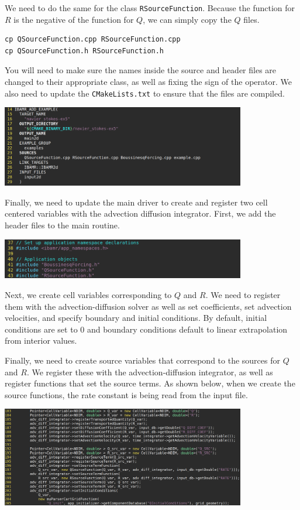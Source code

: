 \documentclass{article}
\begin{document}
We need to do the same for the class \verb|RSourceFunction|. Because the function for $R$ is the negative of the function for $Q$, we can simply copy the $Q$ files.
\begin{verbatim}
cp QSourceFunction.cpp RSourceFunction.cpp
cp QSourceFunction.h RSourceFunction.h
\end{verbatim}
You will need to make sure the names inside the source and header files are changed to their appropriate class, as well as fixing the sign of the operator. We also need to update the \verb|CMakeLists.txt| to ensure that the files are compiled.
\begin{center}
\includegraphics[width=0.8\textwidth]{Graphs/NS-ex5/add_src/cmake_lists.png}
\end{center}

Finally, we need to update the main driver to create and register two cell centered variables with the advection diffusion integrator. First, we add the header files to the main routine.
\begin{center}
\includegraphics[width=0.8\textwidth]{Graphs/NS-ex5/add_src/main_add_headers.png}
\end{center}

Next, we create cell variables corresponding to $Q$ and $R$. We need to register them with the advection-diffusion solver as well as set coefficients, set advection velocities, and specify boundary and initial conditions. By default, initial conditions are set to 0 and boundary conditions default to linear extrapolation from interior values.

Finally, we need to create source variables that correspond to the sources for $Q$ and $R$. We register these with the advection-diffusion integrator, as well as register functions that set the source terms. As shown below, when we create the source functions, the rate constant is being read from the input file.

\begin{center}
\includegraphics[width=0.8\textwidth]{Graphs/NS-ex5/add_src/main_add_sources.png}
\end{center}
\end{document}
